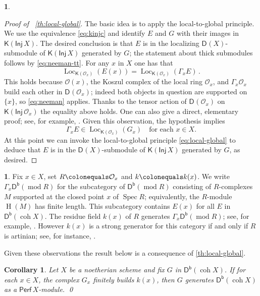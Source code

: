 \documentclass{amsart}
\newcommand{\dcat}[2][]{\cat{D}_{#1}(#2)}
\newcommand{\kinj}[1]{\cat{K}(\cat{Inj}\,#1)}
\newcommand{\perf}[1]{\mathsf{Perf}\,#1}
\newcommand{\coh}{\operatorname{coh}}
\newcommand{\dbcat}[1]{\cat{D}^{\mathsf{b}}(#1)}
\newcommand{\mco}{\mathcal{O}}
\newcommand{\cat}[1]{{\mathsf{#1}}}
\newcommand{\hh}{\operatorname{H}}
\newcommand{\Loc}{\operatorname{Loc}}
\newcommand{\rmod}{\operatorname{mod}}
\newcommand{\res}[2]{{#1}(#2)}
\newcommand{\spec}{\operatorname{Spec}}
\newtheorem{corollary}[subsection]{Corollary}
\theoremstyle{definition}
\newtheorem{chunk}[subsection]{}
\theoremstyle{remark}
\numberwithin{equation}{subsection}
\begin{document}
\begin{chunk}
\begin{proof}[Proof of ~\cref{th:local-global}]
The basic idea is to apply the local-to-global principle. We use the equivalence \cref{eq:kinjc} and identify $E$ and $G$ with their images in $\kinj{X}$. The desired conclusion is that $E$ is in the localizing $\dcat X$-submodule of $\kinj{X}$ generated by $G$; the statement about thick submodules follows by \cref{eq:neeman-tt}. For any $x$ in $X$ one has that
\[
\Loc_{\cat K(\mco_x)}(\res {E}x) = \Loc_{\cat K(\mco_x)}(\varGamma_xE)\,.
\]
This holds because $\res {\mco}x$, the Koszul complex of the local ring $\mco_x$, and $\varGamma_x\mco_x$ build each other in $\dcat{\mco_x}$; indeed both objects in question are supported on $\{x\}$, so \cref{eq:neeman} applies. Thanks to the tensor action of $\dcat{\mco_x}$ on $\kinj{\mco_x}$ the equality above holds. One can also give a direct, elementary proof; see, for example, \cite[Proposition~2.11]{Benson/Iyengar/Krause:2011a}. Given this observation, the hypothesis implies
\[
\varGamma_xE\in \Loc_{\cat K(\mco_x)}(G_x) \quad \text{for each }x\in X.
\]
At this point we can invoke the local-to-global principle \eqref{eq:local-global} to deduce that $E$ is in the $\dcat X$-submodule of $\kinj X$ generated by $G$, as desired.
\end{proof}
\end{chunk}

\begin{chunk}
Fix $x\in X$, set $R\colonequals \mco_x$ and $k\colonequals k(x)$. We write $\varGamma_x\dbcat{\rmod R}$ for the subcategory of $\dbcat{\rmod R}$ consisting of $R$-complexes $M$ supported at the closed point $x$ of $\spec R$; equivalently, the $R$-module $\hh(M)$ has finite length. This subcategory contains $\res{E}x$ for all $E$ in $\dbcat{\coh X}$. The residue field $k(x)$ of $R$ generates $\varGamma_x\dbcat{\rmod R}$; see, for example, \cite{Dwyer/Greenlees/Iyengar:2006b}. However $k(x)$ is a strong generator for this category if and only if $R$ is artinian; see, for instance, \cite{Rouquier:2008}. 
\end{chunk}

Given these observations the result below is a consequence of \cref{th:local-global}.

\begin{corollary}
\label{co:local-global}
Let $X$ be a noetherian scheme and fix $G$ in $\dbcat{\coh X}$. If for each $x\in X$, the complex $G_x$ finitely builds $k(x)$, 
then $G$ generates $\dbcat{\coh X}$ as a $\perf X$-module. \qed
\end{corollary}
\end{document}

